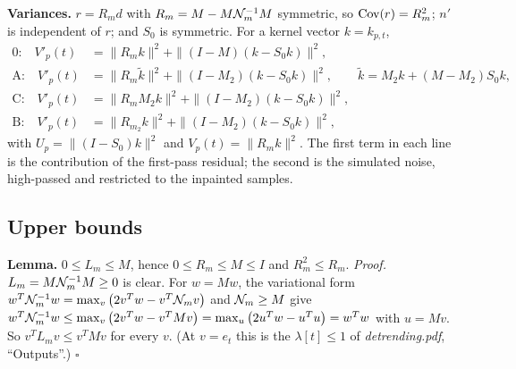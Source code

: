\documentclass{article}
\numberwithin{equation}{section}   %
\def\nn{\nonumber}
\newcommand{\dtnotes}[1]{{\em detrending.pdf}, ``#1''}
\begin{document}
{\bf Variances.}  $r = R_m d$ with $R_m = M - M{\cal N}_m^{-1}M$ symmetric, so ${\rm Cov}(r) = R_m^2$; $n'$
is independent of $r$; and $S_0$ is symmetric.  For a kernel vector $k = k_{p,t}$,
\begin{align}
\mbox{0:}\quad V'_p(t) &= \|R_m k\|^2 + \|(I - M)(k - S_0 k)\|^2 , \nn \\
\mbox{A:}\quad V'_p(t) &= \|R_m \tilde k\|^2 + \|(I - M_2)(k - S_0 k)\|^2 , \qquad
  \tilde k = M_2 k + (M - M_2) S_0 k , \nn \\
\mbox{C:}\quad V'_p(t) &= \|R_m M_2 k\|^2 + \|(I - M_2)(k - S_0 k)\|^2 , \nn \\
\mbox{B:}\quad V'_p(t) &= \|R_{m_2} k\|^2 + \|(I - M_2)(k - S_0 k)\|^2 ,
\label{eq:ip_variances}
\end{align}
with $U_p = \|(I - S_0)k\|^2$ and $V_p(t) = \|R_m k\|^2$.  The first term in each line is the
contribution of the first-pass residual; the second is the simulated noise, high-passed and restricted to
the inpainted samples.

\subsection{Upper bounds}
\label{sec:ip_upper}

{\bf Lemma.}  $0 \le L_m \le M$, hence $0 \le R_m \le M \le I$ and $R_m^2 \le R_m$.  {\em Proof.}
$L_m = M{\cal N}_m^{-1}M \ge 0$ is clear.  For $w = Mw$, the variational form
$w^T{\cal N}_m^{-1}w = \max_v \big(2v^Tw - v^T{\cal N}_m v\big)$ and ${\cal N}_m \ge M$ give
$w^T{\cal N}_m^{-1}w \le \max_v \big(2v^Tw - v^TMv\big) = \max_u \big(2u^Tw - u^Tu\big) = w^Tw$ with
$u = Mv$.  So $v^TL_mv \le v^TMv$ for every $v$.  (At $v = e_t$ this is the $\lambda[t] \le 1$ of
\dtnotes{Outputs}.)  $\square$
\end{document}
